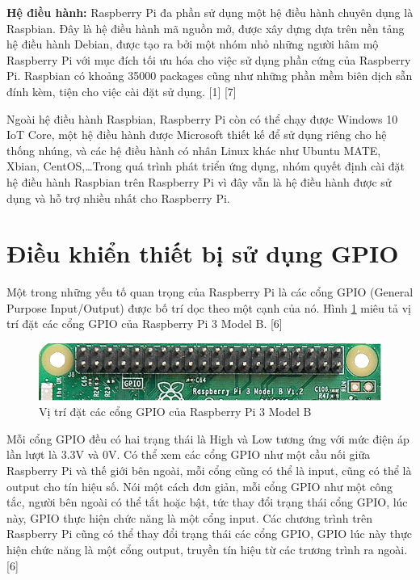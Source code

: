 \documentclass[11pt,a4paper,oneside]{book}
\begin{document}
\textbf{Hệ điều hành:} Raspberry Pi đa phần sử dụng một hệ điều hành chuyên dụng là Raspbian. Đây là hệ điều hành mã nguồn mở, được xây dựng dựa trên nền tảng hệ điều hành Debian, được tạo ra bởi một nhóm nhỏ những người hâm mộ Raspberry Pi với mục đích tối ưu hóa cho việc sử dụng phần cứng của Raspberry Pi. Raspbian có khoảng 35000 packages cũng như những phần mềm biên dịch sẵn đính kèm, tiện cho việc cài đặt sử dụng. [1] [7]

Ngoài hệ điều hành Raspbian, Raspberry Pi còn có thể chạy được Windows 10 IoT Core, một hệ điều hành được Microsoft thiết kế để sử dụng riêng cho hệ thống nhúng, và các hệ điều hành có nhân Linux khác như Ubuntu MATE, Xbian, CentOS,…Trong quá trình phát triển ứng dụng, nhóm quyết định cài đặt hệ điều hành Raspbian trên Raspberry Pi vì đây vẫn là hệ điều hành được sử dụng và hỗ trợ nhiều nhất cho Raspberry Pi.

\section{Điều khiển thiết bị sử dụng GPIO}
Một trong những yếu tố quan trọng của Raspberry Pi là các cổng GPIO (General Purpose Input/Output) được bố trí dọc theo một cạnh của nó. Hình \ref{fig:4-vi-tri-dat-gpio} miêu tả vị trí đặt các cổng GPIO của Raspberry Pi 3 Model B. [6]

\begin{figure}[h]
  \centering
     \includegraphics[scale=0.7]{4-vi-tri-dat-gpio}
  \caption{Vị trí đặt các cổng GPIO của Raspberry Pi 3 Model B}\label{fig:4-vi-tri-dat-gpio}
\end{figure}

Mỗi cổng GPIO đều có hai trạng thái là High và Low tương ứng với mức điện áp lần lượt là 3.3V và 0V. Có thể xem các cổng GPIO như một cầu nối giữa Raspberry Pi và thế giới bên ngoài, mỗi cổng cũng có thể là input, cũng có thể là output cho tín hiệu số. Nói một cách đơn giản, mỗi cổng GPIO như một công tắc, người bên ngoài có thể tắt hoặc bật, tức thay đổi trạng thái cổng GPIO, lúc này, GPIO thực hiện chức năng là một cổng input. Các chương trình trên Raspberry Pi cũng có thể thay đổi trạng thái các cổng GPIO, GPIO lúc này thực hiện chức năng là một cổng output, truyền tín hiệu từ các trương trình ra ngoài. [6]
\end{document}
